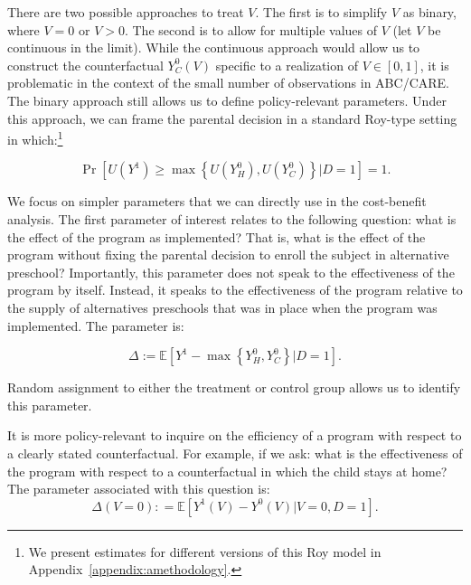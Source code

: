 There are two possible approaches to treat $V$. The first is to simplify $V$ as binary, where $V = 0$ or $V  > 0$. The second is to allow for multiple values of $V$ (let $V$ be continuous in the limit). While the continuous approach would allow us to construct the counterfactual $Y_C^0 \left( V \right)$ specific to a realization of $V \in [0,1]$, it is problematic in the context of the small number of observations in ABC/CARE. The binary approach still allows us to define policy-relevant parameters. Under this approach, we can frame the parental decision in a standard Roy-type setting in which:\footnote{We present estimates for different versions of this Roy model in Appendix~\ref{appendix:amethodology}.}

\begin{equation}
\Pr \left[ U \left(Y^1 \right) \geq  \max \left\{ U \left(  Y_{H}^0 \right),  U\left(Y_{C}^0 \right) \right\} \vert D =  1\right] = 1.
\label{eq:noutility}
\end{equation}

We focus on simpler parameters that we can directly use in the cost-benefit analysis. The first parameter of interest relates to the following question: what is the effect of the program as implemented? That is, what is the effect of the program without fixing the parental decision to enroll the subject in alternative preschool? Importantly, this parameter does not speak to the effectiveness of the program by itself. Instead, it speaks to the effectiveness of the program relative to the supply of alternatives preschools that was in place when the program was implemented. The parameter is:

\begin{equation}
\Delta := \mathbb{E} \left[ Y^1 -  \max \left\{ Y_{H}^0,  Y_{C}^0 \right\} | D =1 \right]. \label{eq:mainest}
\end{equation}

\noindent Random assignment to either the treatment or control group allows us to identify this parameter.

It is more policy-relevant to inquire on the efficiency of a program with respect to a clearly stated counterfactual. For example, if we ask: what is the effectiveness of the program with respect to a counterfactual in which the child stays at home? The parameter associated with this question is:
\begin{equation}
\Delta \left(V = 0 \right) : =   \mathbb{E} \left[ Y^1 \left( V \right) - Y^0 \left( V \right) | V = 0, D = 1 \right]. \label{eq:par0}
\end{equation}

